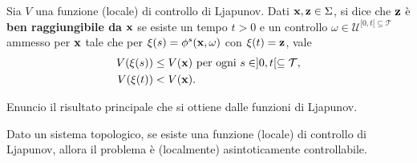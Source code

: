 \begin{definition}
    Sia $V$ una funzione (locale) di controllo di Ljapunov.
    Dati $\mathbf{x}, \mathbf{z} \in \Sigma$, si dice che $\mathbf{z}$ è \textbf{ben raggiungibile
    da} $\mathbf{x}$ se esiste un tempo $t > 0$ e un controllo $\omega \in \mathcal U^{[0,t[ \subseteq \mathcal T}$ ammesso per $\mathbf{x}$
    tale che per $\xi(s) = \phi^s(\mathbf{x}, \omega)$ con $\xi(t) = \mathbf{z}$, vale
    \begin{align*}
        V(\xi(s)) &\leq V(\mathbf{x}) \text{ per ogni } s \in ]0,t[ \subseteq \mathcal T, \\
        V(\xi(t)) &< V(\mathbf{x}).
    \end{align*}
    \label{def:ben-raggiungibile}
\end{definition}

Enuncio il risultato principale che si ottiene dalle funzioni di Ljapunov.
\begin{thm}
    Dato un sistema topologico, se esiste una funzione (locale) di controllo di Ljapunov,
    allora il problema è (localmente) asintoticamente controllabile.
    \label{thm:ljapunov}
\end{thm}

